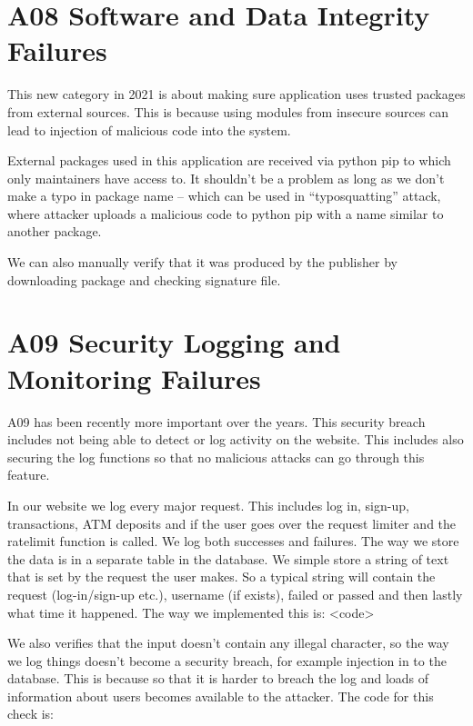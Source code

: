 \section{A08 Software and Data Integrity Failures}

This new category in 2021 is about making sure application uses trusted packages from external sources. This is because using modules from insecure sources can lead to injection of malicious code into the system.

External packages used in this application are received via python pip to which only maintainers have access to. It shouldn’t be a problem as long as we don’t make a typo in package name – which can be used in “typosquatting” attack, where attacker uploads a malicious code to python pip with a name similar to another package.

We can also manually verify that it was produced by the publisher by downloading package and checking signature file.

\section{A09 Security Logging and Monitoring Failures}

A09 has been recently more important over the years. This security breach includes not being able to detect or log activity on the website. This includes also securing the log functions so that no malicious attacks can go through this feature. 

In our website we log every major request. This includes log in, sign-up, transactions, ATM deposits and if the user goes over the request limiter and the ratelimit function is called. We log both successes and failures. The way we store the data is in a separate table in the database. We simple store a string of text that is set by the request the user makes. So a typical string will contain the request (log-in/sign-up etc.), username (if exists), failed or passed and then lastly what time it happened. The way we implemented this is: <code>

We also verifies that the input doesn’t contain any illegal character, so the way we log things doesn’t become a security breach, for example injection in to the database. This is because so that it is harder to breach the log and loads of information about users becomes available to the attacker. The code for this check is: 


